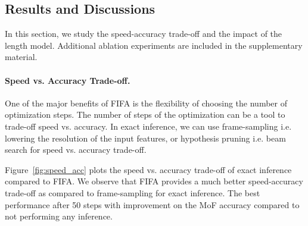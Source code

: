 \subsection{Results and Discussions}
In this section, we study the speed-accuracy trade-off and the impact of the length model. 
Additional ablation experiments are included in the supplementary material.
\paragraph{Speed vs. Accuracy Trade-off.}
One of the major benefits of FIFA is the flexibility of choosing the number of optimization steps. The number of steps of the optimization can be a tool to trade-off speed vs. accuracy.
In exact inference, we can use frame-sampling i.e. lowering the resolution of the input features, or hypothesis pruning i.e. beam search for speed vs. accuracy trade-off.

Figure~\ref{fig:speed_acc} plots the speed vs. accuracy trade-off of exact inference compared to FIFA.
We observe that FIFA provides a much better speed-accuracy trade-off as compared to frame-sampling for exact inference. The best performance after 50 steps with  improvement on the MoF accuracy compared to not performing any inference.



\begin{comment}
   
\begin{table}[tb]
   \centering
   \resizebox{0.75\columnwidth}{!}{\begin{tabular}{cccccc }
         \toprule
         Num. Steps & MoF & MoF-BG & IoU & IoD & Time (min) \\
         \midrule
         No inference & 45.4 & 44.7 & 37.3 & 51.2 & 1.0\\
         \midrule
         2 steps  & 47.9 & 47.1 & 39.8 & 53.0 & 1.2 \\
         5 steps  & 49.1 & 48.3 & 40.0 & 52.8 & 1.5 \\
         10 steps & 50.1 & 49.4 & 40.2 & 52.9 & 2.0\\
         30 steps & 51.2 & 50.6 & 41.0 & 53.2 & 4.2\\
         50 steps & \textbf{51.3} & \textbf{50.7} & \textbf{41.1} & \textbf{53.3} & 6.5 \\
         60 steps & \textbf{51.3} & \textbf{50.7} & \textbf{41.1} & \textbf{53.3} & 7.7 \\
         \midrule
         Exact Inference & 50.7 & 50.3 & 40.9 & 54.0 & 32.85 \\
         \bottomrule
      \end{tabular}
    }
   \caption{Impact of the number of optimization steps for FIFA+MuCon for weakly supervised action segmentation on the Breakfast dataset.
}
   \label{tab:optimization_steps}
\end{table}

\end{comment}


